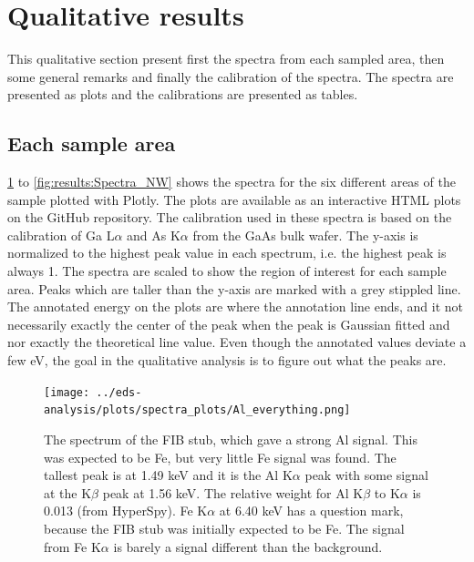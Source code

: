 \section{Qualitative results}
\label{sec:results:qualitative}

This qualitative section present first the spectra from each sampled area, then some general remarks and finally the calibration of the spectra. The spectra are presented as plots and the calibrations are presented as tables.


\subsection{Each sample area}
\label{sec:results:qualitative:each_sample_area}

\cref{fig:results:Spectra_Al} to \cref{fig:results:Spectra_NW} shows the spectra for the six different areas of the sample plotted with Plotly.
The plots are available as an interactive HTML plots on the GitHub repository.
The calibration used in these spectra is based on the calibration of Ga L$\alpha$ and As K$\alpha$ from the GaAs bulk wafer.
The y-axis is normalized to the highest peak value in each spectrum, i.e. the highest peak is always 1. %
The spectra are scaled to show the region of interest for each sample area.
Peaks which are taller than the y-axis are marked with a grey stippled line.
The annotated energy on the plots are where the annotation line ends, and it not necessarily exactly the center of the peak when the peak is Gaussian fitted and nor exactly the theoretical line value.
Even though the annotated values deviate a few eV, the goal in the qualitative analysis is to figure out what the peaks are.



\begin{figure}[h!]
    \centering
    \texttt{[image: ../eds-analysis/plots/spectra\_plots/Al\_everything.png]}
    \caption{
        The spectrum of the FIB stub, which gave a strong Al signal.
        This was expected to be Fe, but very little Fe signal was found.
        The tallest peak is at 1.49 keV and it is the Al K$\alpha$ peak with some signal at the K$\beta$ peak at 1.56 keV.
        The relative weight for Al K$\beta$ to K$\alpha$ is 0.013 (from HyperSpy).
        Fe K$\alpha$ at 6.40 keV has a question mark, because the FIB stub was initially expected to be Fe.
        The signal from Fe K$\alpha$ is barely a signal different than the background.
    }
    \label{fig:results:Spectra_Al}
\end{figure}

